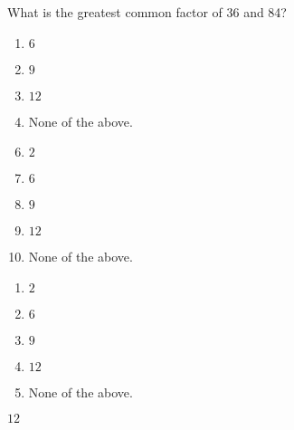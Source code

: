 


  What is the greatest common factor of 36 and 84?


\ifsat
	\begin{enumerate}[label=\Alph*)]
		\item  $6$  
		\item  $9$  
		\item  $12$ %
		\item  None of the above. 
	\end{enumerate}
\else
\fi

\ifacteven
	\begin{enumerate}[label=\textbf{\Alph*.},itemsep=\fill,align=left]
		\setcounter{enumii}{5}
		\item  $2$ 
		\item  $6$  
		\item  $9$  
		\addtocounter{enumii}{1}
		\item  $12$ %
		\item  None of the above. 
	\end{enumerate}
\else
\fi

\ifactodd
	\begin{enumerate}[label=\textbf{\Alph*.},itemsep=\fill,align=left]
		\item  $2$ 
		\item  $6$  
		\item  $9$  
		\item  $12$ %
		\item  None of the above. 
	\end{enumerate}
\else
\fi

\ifgridin
  $12$ %
		
\else
\fi

